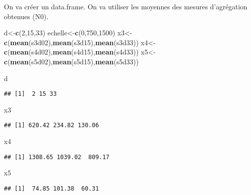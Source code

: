 \documentclass[
]{article}
\newenvironment{Shaded}{\begin{snugshade}}{\end{snugshade}}
\newcommand{\DecValTok}[1]{\textcolor[rgb]{0.00,0.00,0.81}{#1}}
\newcommand{\KeywordTok}[1]{\textcolor[rgb]{0.13,0.29,0.53}{\textbf{#1}}}
\newcommand{\NormalTok}[1]{#1}
\begin{document}
On va créer un data.frame. On va utiliser les moyennes des mesures
d'agrégation obtenues (N0).

\begin{Shaded}
\begin{Highlighting}[]
\NormalTok{d<-}\KeywordTok{c}\NormalTok{(}\DecValTok{2}\NormalTok{,}\DecValTok{15}\NormalTok{,}\DecValTok{33}\NormalTok{)}
\NormalTok{echelle<-}\KeywordTok{c}\NormalTok{(}\DecValTok{0}\NormalTok{,}\DecValTok{750}\NormalTok{,}\DecValTok{1500}\NormalTok{)}
\NormalTok{x3<-}\KeywordTok{c}\NormalTok{(}\KeywordTok{mean}\NormalTok{(s3d02),}\KeywordTok{mean}\NormalTok{(s3d15),}\KeywordTok{mean}\NormalTok{(s3d33))}
\NormalTok{x4<-}\KeywordTok{c}\NormalTok{(}\KeywordTok{mean}\NormalTok{(s4d02),}\KeywordTok{mean}\NormalTok{(s4d15),}\KeywordTok{mean}\NormalTok{(s4d33)) }
\NormalTok{x5<-}\KeywordTok{c}\NormalTok{(}\KeywordTok{mean}\NormalTok{(s5d02),}\KeywordTok{mean}\NormalTok{(s5d15),}\KeywordTok{mean}\NormalTok{(s5d33))}

\NormalTok{d}
\end{Highlighting}
\end{Shaded}

\begin{verbatim}
## [1]  2 15 33
\end{verbatim}

\begin{Shaded}
\begin{Highlighting}[]
\NormalTok{x3}
\end{Highlighting}
\end{Shaded}

\begin{verbatim}
## [1] 620.42 234.82 130.06
\end{verbatim}

\begin{Shaded}
\begin{Highlighting}[]
\NormalTok{x4}
\end{Highlighting}
\end{Shaded}

\begin{verbatim}
## [1] 1308.65 1039.02  809.17
\end{verbatim}

\begin{Shaded}
\begin{Highlighting}[]
\NormalTok{x5}
\end{Highlighting}
\end{Shaded}

\begin{verbatim}
## [1]  74.85 101.38  60.31
\end{verbatim}
\end{document}
